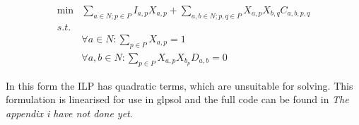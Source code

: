\begin{align}
	\nonumber \min & \sum_{a \in N; p \in P} I_{a,p}X_{a,p} + \sum_{a,b \in N; p,q \in P} X_{a,p}X_{b,q}C_{a,b,p,q} \\
	\nonumber s.t. &  \\
	\nonumber & \forall a \in N : \sum_{p \in P}X_{a,p} = 1 \\
	\nonumber & \forall a,b \in N : \sum_{p \in P}X_{a,p}X_{b_p}D_{a,b} = 0
\end{align}

In this form the ILP has quadratic terms, which are unsuitable for solving.
This formulation is linearised for use in glpsol and the full code can be found in {\em The appendix i have not done yet}.%
